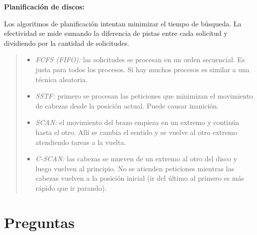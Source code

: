 \documentclass[a4paper,10pt,spanish]{article}
\begin{document}
\textbf{Planificación de discos:}

Los algoritmos de planificación intentan minimizar el tiempo de búsqueda. La efectividad se mide sumando la diferencia de pistas entre cada solicitud y dividiendo por la cantidad de solicitudes. \\

\begin{quote}
\begin{itemize}
\item \textit{FCFS (FIFO):} las solicitudes se procesan en un orden secuencial. Es justa para todos los procesos. Si hay muchos procesos es similar a una técnica aleatoria.

\item \textit{SSTF:} primero se procesan las peticiones que minimizan el movimiento de cabezas desde la posición actual. Puede causar inanición.

\item \textit{SCAN:} el movimiento del brazo empieza en un extremo y continúa hasta el otro. Allí se cambia el sentido y se vuelve al otro extremo atendiendo tareas a la vuelta.

\item \textit{C-SCAN:} las cabezas se mueven de un extremo al otro del disco y luego vuelven al principio. No se atienden peticiones mientras las cabezas vuelven a la posición inicial (ir del último al primero es más rápido que ir parando). 
\end{itemize}
\end{quote}

\section{Preguntas}
\end{document}
